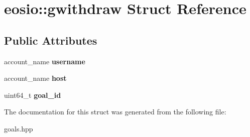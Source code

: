 \hypertarget{structeosio_1_1gwithdraw}{}\section{eosio\+:\+:gwithdraw Struct Reference}
\label{structeosio_1_1gwithdraw}
\subsection*{Public Attributes}
\begin{DoxyCompactItemize}
\item 
\mbox{\label{structeosio_1_1gwithdraw_a54592255ad5cc0b4478952cf132421b8}} 
account\+\_\+name {\bfseries username}
\item 
\mbox{\label{structeosio_1_1gwithdraw_a37578b0a8a62169d6f28b39fbe011e55}} 
account\+\_\+name {\bfseries host}
\item 
\mbox{\label{structeosio_1_1gwithdraw_a01ab8e0c959fda4d49cc3a334e65b4f1}} 
uint64\+\_\+t {\bfseries goal\+\_\+id}
\end{DoxyCompactItemize}


The documentation for this struct was generated from the following file\+:\begin{DoxyCompactItemize}
\item 
goals.\+hpp\end{DoxyCompactItemize}
